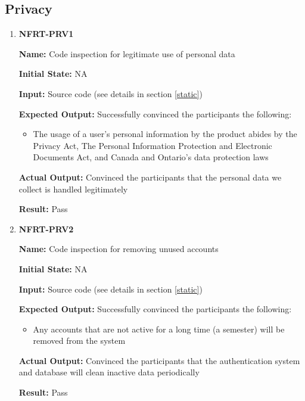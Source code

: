 \documentclass[12pt, titlepage]{article}
\begin{document}
\subsection{Privacy}
\begin{enumerate}
\item \textbf{NFRT-PRV1}

\textbf{Name:} Code inspection for legitimate use of personal data

\textbf{Initial State:} NA

\textbf{Input:} Source code (see details in section \ref{static})

\textbf{Expected Output:} Successfully convinced the participants the following:
\begin{itemize}
\item The usage of a user's personal information by the product abides by the Privacy Act, The Personal Information Protection and Electronic Documents Act, and Canada and Ontario's data protection laws
\end{itemize}

\textbf{Actual Output:} Convinced the participants that the personal data we collect is handled legitimately

\textbf{Result:} Pass

\item \textbf{NFRT-PRV2}

\textbf{Name:} Code inspection for removing unused accounts

\textbf{Initial State:} NA

\textbf{Input:} Source code (see details in section \ref{static})

\textbf{Expected Output:} Successfully convinced the participants the following:
\begin{itemize}
\item Any accounts that are not active for a long time (a semester) will be removed from the system
\end{itemize}

\textbf{Actual Output:} Convinced the participants that the authentication system and database will clean inactive data periodically

\textbf{Result:} Pass
\end{enumerate}
\end{document}
